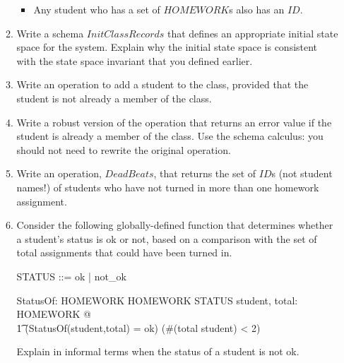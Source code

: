 \documentclass{article}
\begin{document}
\begin{enumerate}
\begin{enumerate}
\begin{itemize}
\item Any student who has a set of $HOMEWORK$s also has an $ID$.

\end{itemize}


\item Write a schema $InitClassRecords$ that defines an
appropriate initial state space for the system. Explain why the
initial state space is consistent with the state space invariant
that you defined earlier.


\item Write an operation to add a student to the class, provided
that the student is not already a member of the class.


\item Write a robust version of the operation that returns an error
value if the student is already a member of the class. Use the schema
calculus: you should not need to rewrite the original operation.


\item Write an operation, $DeadBeats$, that returns the set of $ID$s
(not student names!) of students who have not turned in more than one homework assignment.


\item Consider the following globally-defined function that
determines whether a student's status is ok or not, based on a
comparison with the set of total assignments that could have been
turned in.

\begin{zed}
    STATUS ::= ok | not\_ok
\end{zed}

\begin{axdef}
    StatusOf: \power HOMEWORK \cross \power HOMEWORK \fun STATUS
\where
    \forall student, total: \power HOMEWORK @ \\
\t1    (StatusOf(student,total) = ok) \iff (\#(total \setminus
student) < 2)
\end{axdef}

Explain in informal terms when the status of a student is not ok.


\end{enumerate}


\end{enumerate}
\end{document}
